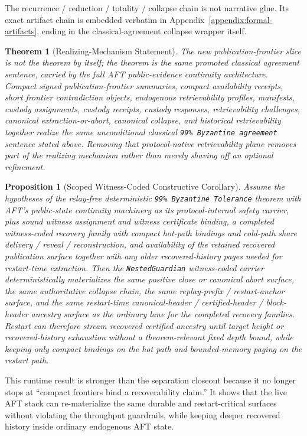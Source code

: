 \documentclass[11pt]{article}
\newtheorem{theorem}{Theorem}
\newtheorem{proposition}{Proposition}
\newcommand{\AFT}{\textsc{AFT}}
\newcommand{\code}[1]{\texttt{#1}}
\begin{document}
The recurrence / reduction / totality / collapse chain is not narrative glue.
Its exact artifact chain is embedded verbatim in
Appendix~\ref{appendix:formal-artifacts}, ending in the classical-agreement
collapse wrapper itself.

\begin{theorem}[Realizing-Mechanism Statement]
The new publication-frontier slice is not the theorem by itself; the theorem is
the same promoted classical agreement sentence, carried by the full \AFT{}
public-evidence continuity architecture. Compact
signed publication-frontier summaries, compact availability receipts, short
frontier contradiction objects, endogenous retrievability profiles, manifests,
custody assignments, custody receipts, custody responses, retrievability
challenges, canonical extraction-or-abort, canonical collapse, and historical
retrievability together realize the same
unconditional classical
\code{99\% Byzantine agreement} sentence stated above. Removing that
protocol-native retrievability plane removes part of the realizing mechanism
rather than merely shaving off an optional refinement.
\end{theorem}

\begin{proposition}[Scoped Witness-Coded Constructive Corollary]
Assume the hypotheses of the relay-free deterministic
\code{99\% Byzantine Tolerance} theorem with AFT's public-state continuity
machinery as its protocol-internal safety carrier, plus sound witness assignment and witness
certificate binding, a completed witness-coded recovery family with compact
hot-path bindings and cold-path share delivery / reveal / reconstruction, and
availability of the retained recovered publication surface together with any
older recovered-history pages needed for restart-time extraction. Then the
\code{NestedGuardian} witness-coded carrier deterministically materializes the
same positive close or canonical abort surface, the same authoritative
collapse chain, the same replay-prefix / restart-anchor surface, and the same
restart-time canonical-header / certified-header / block-header ancestry
surface as the ordinary lane for the completed recovery families. Restart can
therefore stream recovered certified ancestry until target height or
recovered-history exhaustion without a theorem-relevant fixed depth bound,
while keeping only compact bindings on the hot path and bounded-memory paging
on the restart path.
\end{proposition}

This runtime result is stronger than the separation closeout because it no
longer stops at ``compact frontiers bind a recoverability claim.'' It shows
that the live AFT stack can re-materialize the same durable and
restart-critical surfaces without violating the throughput guardrails, while
keeping deeper recovered history inside ordinary endogenous AFT state.
\end{document}
